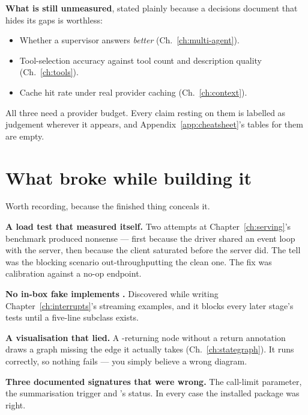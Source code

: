 \begin{warning}
\textbf{What is still unmeasured}, stated plainly because a decisions document
that hides its gaps is worthless:

\begin{itemize}[leftmargin=1.4em,nosep]
\item Whether a supervisor answers \emph{better} (Ch.~\ref{ch:multi-agent}).
\item Tool-selection accuracy against tool count and description quality
      (Ch.~\ref{ch:tools}).
\item Cache hit rate under real provider caching (Ch.~\ref{ch:context}).
\end{itemize}

All three need a provider budget. Every claim resting on them is labelled as
judgement wherever it appears, and Appendix~\ref{app:cheatsheet}'s tables for
them are empty.
\end{warning}

\section{What broke while building it}
\label{sec:what-broke}

Worth recording, because the finished thing conceals it.

\textbf{A load test that measured itself.} Two attempts at
Chapter~\ref{ch:serving}'s benchmark produced nonsense --- first because the
driver shared an event loop with the server, then because the client saturated
before the server did. The tell was the blocking scenario out-throughputting the
clean one. The fix was calibration against a no-op endpoint.

\textbf{No in-box fake implements .} Discovered while writing
Chapter~\ref{ch:interrupts}'s streaming examples, and it blocks every later
stage's tests until a five-line subclass exists.

\textbf{A visualisation that lied.} A -returning node without a
return annotation draws a graph missing the edge it actually takes
(Ch.~\ref{ch:stategraph}). It runs correctly, so nothing fails --- you simply
believe a wrong diagram.

\textbf{Three documented signatures that were wrong.} The call-limit parameter,
the summarisation trigger and 's status. In every case
the installed package was right.

